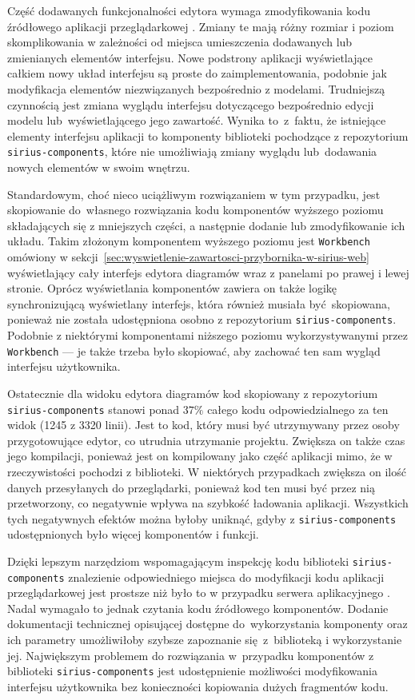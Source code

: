 Część dodawanych funkcjonalności edytora wymaga zmodyfikowania kodu źródłowego
aplikacji przeglądarkowej \SiriusWeb{}. Zmiany te mają różny rozmiar i
poziom skomplikowania w zależności od miejsca umieszczenia
dodawanych lub zmienianych elementów interfejsu.
Nowe podstrony aplikacji wyświetlające całkiem nowy układ interfejsu są proste
do zaimplementowania, podobnie jak modyfikacja elementów niezwiązanych
bezpośrednio z modelami. Trudniejszą czynnością jest zmiana wyglądu interfejsu
dotyczącego bezpośrednio edycji modelu lub~wyświetlającego jego zawartość.
Wynika to~z~faktu, że istniejące elementy interfejsu
aplikacji \SiriusWeb{} to komponenty biblioteki \React{} pochodzące z
repozytorium \texttt{sirius-components}, które nie umożliwiają zmiany wyglądu
lub~dodawania nowych elementów w swoim wnętrzu.

Standardowym, choć nieco uciążliwym rozwiązaniem w tym przypadku, jest
skopiowanie do~własnego rozwiązania kodu komponentów wyższego poziomu
składających
się z mniejszych
części, a następnie dodanie lub zmodyfikowanie ich układu. Takim złożonym
komponentem wyższego poziomu jest \texttt{Workbench} omówiony w
sekcji~\ref{sec:wyswietlenie-zawartosci-przybornika-w-sirius-web} wyświetlający
cały interfejs edytora diagramów wraz z panelami po prawej i lewej stronie.
Oprócz wyświetlania komponentów zawiera on także logikę synchronizującą
wyświetlany interfejs,
która również musiała być~skopiowana, ponieważ nie została udostępniona osobno
z repozytorium \texttt{sirius-components}. Podobnie z niektórymi komponentami
niższego poziomu wykorzystywanymi przez \texttt{Workbench} --- je także trzeba
było skopiować, aby zachować ten sam wygląd interfejsu użytkownika.

Ostatecznie dla widoku edytora diagramów kod skopiowany z repozytorium
\texttt{sirius-\allowbreak components} %
stanowi ponad $37\%$ całego kodu
odpowiedzialnego za ten widok (1245 z 3320 linii). Jest to kod, który musi być
utrzymywany przez osoby przygotowujące edytor, co utrudnia utrzymanie projektu.
Zwiększa on także czas jego kompilacji, ponieważ jest on kompilowany jako
część aplikacji mimo, że w rzeczywistości pochodzi z biblioteki. W niektórych
przypadkach zwiększa on ilość danych przesyłanych do przeglądarki, ponieważ kod
ten musi być przez nią przetworzony, co negatywnie wpływa na szybkość ładowania
aplikacji. Wszystkich tych negatywnych efektów można byłoby uniknąć, gdyby z
\texttt{sirius-components} udostępnionych było więcej komponentów i funkcji.

Dzięki lepszym narzędziom wspomagającym inspekcję kodu biblioteki
\texttt{sirius-components} znalezienie odpowiedniego miejsca do modyfikacji
kodu aplikacji przeglądarkowej jest prostsze niż było to w przypadku serwera
aplikacyjnego \SiriusWeb{}. Nadal wymagało to jednak czytania kodu źródłowego
komponentów. Dodanie dokumentacji technicznej
opisującej dostępne do~wykorzystania komponenty oraz ich parametry umożliwiłoby
szybsze zapoznanie się~z~biblioteką i wykorzystanie jej. Największym problemem
do rozwiązania w~przypadku komponentów z biblioteki \texttt{sirius-components}
jest udostępnienie możliwości modyfikowania interfejsu użytkownika
bez konieczności kopiowania dużych fragmentów kodu.

